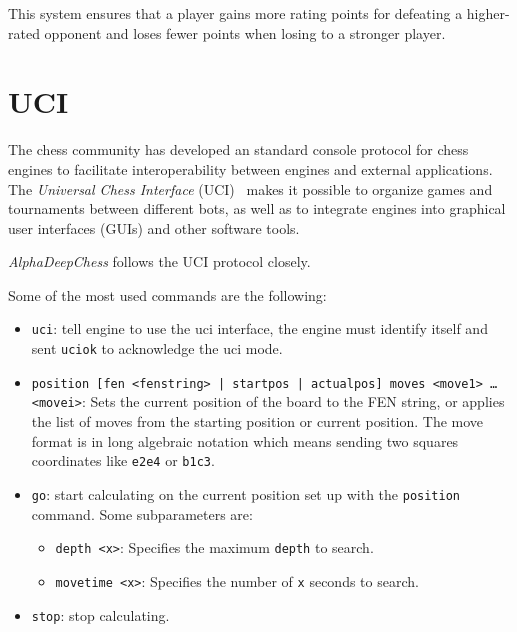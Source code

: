 This system ensures that a player gains more rating points for defeating a higher-rated opponent and loses fewer points when losing to a stronger player.

\section{UCI}\label{sec:uci}

\noindent The chess community has developed an standard console protocol for chess engines to facilitate interoperability between engines and external applications. The \textit{Universal Chess Interface} (UCI)~\cite{UciProtocol} makes it possible to organize games and tournaments between different bots, as well as to integrate engines into graphical user interfaces (GUIs) and other software tools.

\vspace{1em}

\textit{AlphaDeepChess} follows the UCI protocol closely.

\vspace{1em}

\noindent Some of the most used commands are the following:

\begin{itemize}[itemsep=1pt]

    \item \texttt{uci}: tell engine to use the uci interface, the engine must identify itself and sent \texttt{uciok} to acknowledge the uci mode.
    \item \texttt{position [fen <fenstring> | startpos | actualpos] moves <move1> \ldots \\<movei>}: Sets the current position of the board to the FEN string, or applies the list of moves from the starting position or current position. The move format is in long algebraic notation which means sending two squares coordinates like \texttt{e2e4} or \texttt{b1c3}.

    \item \texttt{go}: start calculating on the current position set up with the \texttt{position} command. Some  subparameters are:
    \begin{itemize}[itemsep=1pt]
        \item \texttt{depth <x>}: Specifies the maximum \texttt{depth} to search.
        \item \texttt{movetime <x>}: Specifies the number of \texttt{x} seconds to search. 
    \end{itemize}

    \item \texttt{stop}: stop calculating.
\end{itemize}

